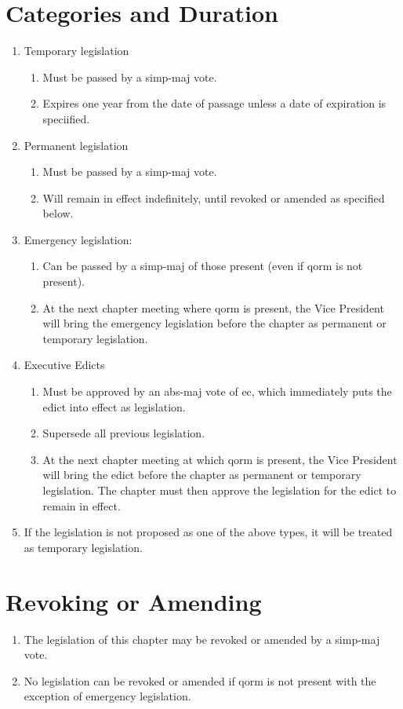 	\section{Categories and Duration}
		\begin{enumerate}
			\item Temporary legislation 
			\begin{enumerate}
				\item Must be passed by a \gls{simp-maj} vote.
				\item Expires one year from the date of passage unless a date of expiration is speciified.
			\end{enumerate}
			\item Permanent legislation
			\begin{enumerate}
				\item Must be passed by a \gls{simp-maj} vote.
				\item Will remain in effect indefinitely, until revoked or amended as specified below.
			\end{enumerate}
			\item Emergency legislation:
			\begin{enumerate}
				\item Can be passed by a \gls{simp-maj} of those present (even if \gls{qorm} is not present). %
				\item At the next chapter meeting where \gls{qorm} is present, the Vice President will bring the emergency legislation before the chapter as permanent or temporary legislation.
			\end{enumerate}
			\item Executive Edicts
			\label{exec-edict}
			\begin{enumerate}
				\item Must be approved by an \gls{abs-maj} vote of \gls{ec}, which immediately puts the edict into effect as legislation.
				\item Supersede all previous legislation.
				\item At the next chapter meeting at which \gls{qorm} is present, the Vice President will bring the edict before the chapter as permanent or temporary legislation. The chapter must then approve the legislation for the edict to remain in effect. %
			\end{enumerate}
			\item If the legislation is not proposed as one of the above types, it will be treated as temporary legislation.
		\end{enumerate}

	\section{Revoking or Amending}
		\begin{enumerate}
			\item The legislation of this chapter may be revoked or amended by a \gls{simp-maj} vote.
			\item No legislation can be revoked or amended if \gls{qorm} is not present with the exception of emergency legislation.

		\end{enumerate}


